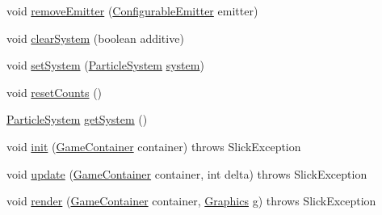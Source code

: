 \begin{DoxyCompactItemize}
\item 
void \mbox{\hyperlink{classorg_1_1newdawn_1_1slick_1_1tools_1_1peditor_1_1_particle_game_a078d9da755f34a15c0a57e5fd3442e35}{remove\+Emitter}} (\mbox{\hyperlink{classorg_1_1newdawn_1_1slick_1_1particles_1_1_configurable_emitter}{Configurable\+Emitter}} emitter)
\item 
void \mbox{\hyperlink{classorg_1_1newdawn_1_1slick_1_1tools_1_1peditor_1_1_particle_game_a35c4aec3f19a81ace80cd0ba3929680d}{clear\+System}} (boolean additive)
\item 
void \mbox{\hyperlink{classorg_1_1newdawn_1_1slick_1_1tools_1_1peditor_1_1_particle_game_af5abd2643e2206a84401965789da9ca2}{set\+System}} (\mbox{\hyperlink{classorg_1_1newdawn_1_1slick_1_1particles_1_1_particle_system}{Particle\+System}} \mbox{\hyperlink{classorg_1_1newdawn_1_1slick_1_1tools_1_1peditor_1_1_particle_game_a3a6d42e312039ae4f175e6751256f2f7}{system}})
\item 
void \mbox{\hyperlink{classorg_1_1newdawn_1_1slick_1_1tools_1_1peditor_1_1_particle_game_af99cbfa883cc49903418ff2ab2af92ac}{reset\+Counts}} ()
\item 
\mbox{\hyperlink{classorg_1_1newdawn_1_1slick_1_1particles_1_1_particle_system}{Particle\+System}} \mbox{\hyperlink{classorg_1_1newdawn_1_1slick_1_1tools_1_1peditor_1_1_particle_game_a863b0f3f5c65d561161edf6bfc6c1d8f}{get\+System}} ()
\item 
void \mbox{\hyperlink{classorg_1_1newdawn_1_1slick_1_1tools_1_1peditor_1_1_particle_game_a61bb3979430161b538b956862686769f}{init}} (\mbox{\hyperlink{classorg_1_1newdawn_1_1slick_1_1_game_container}{Game\+Container}} container)  throws Slick\+Exception 
\item 
void \mbox{\hyperlink{classorg_1_1newdawn_1_1slick_1_1tools_1_1peditor_1_1_particle_game_ae7a6cbca46bc737863738c8ff781f71c}{update}} (\mbox{\hyperlink{classorg_1_1newdawn_1_1slick_1_1_game_container}{Game\+Container}} container, int delta)  throws Slick\+Exception 
\item 
void \mbox{\hyperlink{classorg_1_1newdawn_1_1slick_1_1tools_1_1peditor_1_1_particle_game_a36b19314b15adc03c946731dc3604acd}{render}} (\mbox{\hyperlink{classorg_1_1newdawn_1_1slick_1_1_game_container}{Game\+Container}} container, \mbox{\hyperlink{classorg_1_1newdawn_1_1slick_1_1_graphics}{Graphics}} g)  throws Slick\+Exception 
\end{DoxyCompactItemize}
